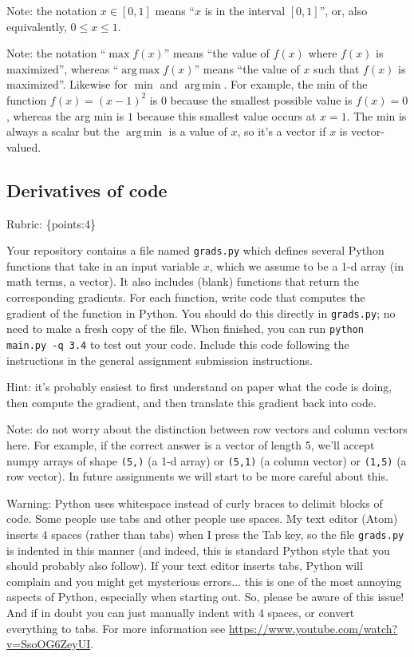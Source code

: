 \documentclass{article}
\def\rubric#1{\gre{Rubric: \{#1\}}}{}
\def\blu#1{{\color{blu}#1}}
\def\gre#1{{\color{gre}#1}}
\DeclareMathOperator*\argmax{arg\,max}
\DeclareMathOperator*\argmin{arg\,min}
\begin{document}
	Note: the notation $x\in [0,1]$ means ``$x$ is in the interval $[0,1]$'', or, also equivalently, $0 \leq x \leq 1$.

	Note: the notation ``$\max f(x)$'' means ``the value of $f(x)$ where $f(x)$ is maximized'', whereas ``$\argmax f(x)$'' means ``the value of $x$ such that $f(x)$ is maximized''.
	Likewise for $\min$ and $\argmin$. For example, the min of the function $f(x)=(x-1)^2$ is $0$ because the smallest possible value is $f(x)=0$,
	whereas the arg min is $1$ because this smallest value occurs at $x=1$. The min is always a scalar but the $\argmin$ is a value of $x$, so it's a vector
	if $x$ is vector-valued.

	\subsection{Derivatives of code}

	\rubric{points:4}

	Your repository contains a file named \texttt{grads.py} which defines several Python functions that take in an input variable $x$, which we assume to be a 1-d array (in math terms, a vector).
	It also includes (blank) functions that return the corresponding gradients.
	For each function, \blu{write code that computes the gradient of the function} in Python.
	You should do this directly in \texttt{grads.py}; no need to make a fresh copy of the file. When finished, you can run \texttt{python main.py -q 3.4} to test out your code. \blu{Include this code following the instructions in the general assignment submission instructions.}

	Hint: it's probably easiest to first understand on paper what the code is doing, then compute
	the gradient, and then translate this gradient back into code.

	Note: do not worry about the distinction between row vectors and column vectors here.
	For example, if the correct answer is a vector of length 5, we'll accept numpy arrays
	of shape \texttt{(5,)} (a 1-d array) or \texttt{(5,1)} (a column vector) or
	\texttt{(1,5)} (a row vector). In future assignments we will start to be more careful
	about this.

	Warning: Python uses whitespace instead of curly braces to delimit blocks of code.
	Some people use tabs and other people use spaces. My text editor (Atom) inserts 4 spaces (rather than tabs) when
	I press the Tab key, so the file \texttt{grads.py} is indented in this manner (and indeed, this is standard Python style that you should probably also follow). If your text editor inserts tabs,
	Python will complain and you might get mysterious errors... this is one of the most annoying aspects
	of Python, especially when starting out. So, please be aware of this issue! And if in doubt you can just manually
	indent with 4 spaces, or convert everything to tabs. For more information
	see \url{https://www.youtube.com/watch?v=SsoOG6ZeyUI}.
\end{document}
